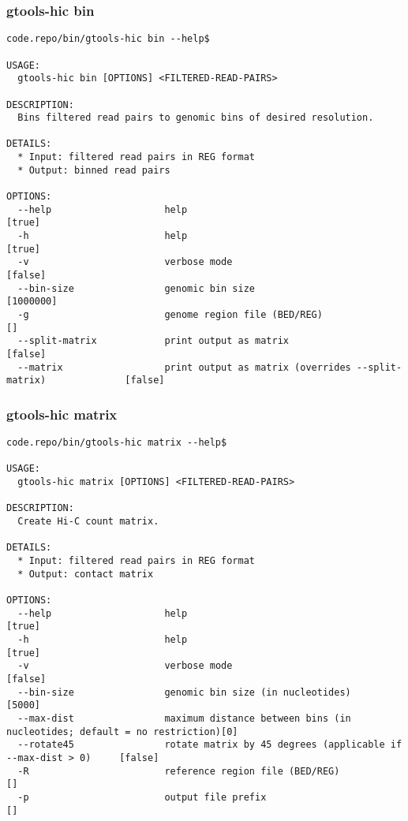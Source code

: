 \subsubsection{gtools-hic bin}\label{gtools-hic_bin}
\begin{lstlisting}
code.repo/bin/gtools-hic bin --help$

USAGE:
  gtools-hic bin [OPTIONS] <FILTERED-READ-PAIRS>

DESCRIPTION:
  Bins filtered read pairs to genomic bins of desired resolution.

DETAILS:
  * Input: filtered read pairs in REG format
  * Output: binned read pairs

OPTIONS:
  --help                    help                                                           [true]
  -h                        help                                                           [true]
  -v                        verbose mode                                                   [false]
  --bin-size                genomic bin size                                               [1000000]
  -g                        genome region file (BED/REG)                                   []
  --split-matrix            print output as matrix                                         [false]
  --matrix                  print output as matrix (overrides --split-matrix)              [false]
\end{lstlisting}
%
\subsubsection{gtools-hic matrix}\label{gtools-hic_matrix}
\begin{lstlisting}
code.repo/bin/gtools-hic matrix --help$

USAGE:
  gtools-hic matrix [OPTIONS] <FILTERED-READ-PAIRS>

DESCRIPTION:
  Create Hi-C count matrix.

DETAILS:
  * Input: filtered read pairs in REG format
  * Output: contact matrix

OPTIONS:
  --help                    help                                                           [true]
  -h                        help                                                           [true]
  -v                        verbose mode                                                   [false]
  --bin-size                genomic bin size (in nucleotides)                              [5000]
  --max-dist                maximum distance between bins (in nucleotides; default = no restriction)[0]
  --rotate45                rotate matrix by 45 degrees (applicable if --max-dist > 0)     [false]
  -R                        reference region file (BED/REG)                                []
  -p                        output file prefix                                             []
\end{lstlisting}
%
